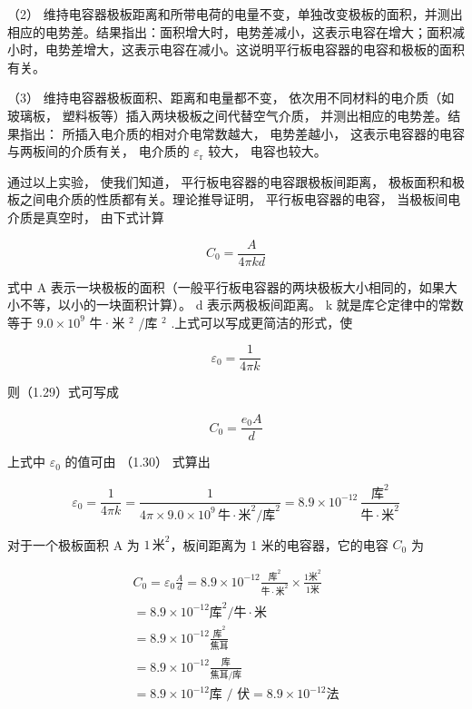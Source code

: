（2）
维持电容器极板距离和所带电荷的电量不变，单独改变极板的面积，并测出相应的电势差。结果指出：面积增大时，电势差减小，这表示电容在增大；面积减小时，电势差增大，这表示电容在减小。这说明平行板电容器的电容和极板的面积有关。

（3） 维持电容器极板面积、距离和电量都不变，
依次用不同材料的电介质（如玻璃板，
塑料板等）插入两块极板之间代替空气介质， 并测出相应的电势差。结果指出：
所插入电介质的相对介电常数越大， 电势差越小，
这表示电容器的电容与两板间的介质有关， 电介质的
\(\varepsilon_{\mathrm{r}}\) 较大， 电容也较大。

通过以上实验， 使我们知道， 平行板电容器的电容跟极板间距离，
极板面积和极板之间电介质的性质都有关。理论推导证明，
平行板电容器的电容， 当极板间电介质是真空时， 由下式计算

\[
C_{0} = \frac{A}{4 \pi k d} \tag{1.29}
\]

式中 A
表示一块极板的面积（一般平行板电容器的两块极板大小相同的，如果大小不等，以小的一块面积计算）。
d 表示两极板间距离。 k 就是库仑定律中的常数等于 \(9.0 \times 10^{9}\)
牛·米 \(^{2}\) /库 \(^{2}\) .上式可以写成更简洁的形式，使

\[
\varepsilon_{0}=\frac{1}{4\pi k} \tag{1.30}
\]

则（1.29）式可写成

\[
C_{0} = \frac{e_{0} A}{d} \tag{1.31}
\]

上式中 \(\varepsilon_{0}\) 的值可由 （1.30） 式算出

\[
\varepsilon_{0}=\frac{1}{4\pi k}=\frac{1}{4\pi\times9.0\times10^{9}\,\text{牛}\cdot\text{米}^{2}/\text{库}^{2}}=8.9\times10^{-12}\,\frac{\text{库}^{2}}{\text{牛}\cdot\text{米}^{2}}
\]

对于一个极板面积 A 为 \(1 \, \text{米}^{2}\)，板间距离为 1
米的电容器，它的电容 \(C_{0}\) 为

\[
\begin{array}{l} C_{0} = \varepsilon_{0} \frac{A}{d} = 8.9 \times 10^{- 12} \frac{\text{库}^{2}}{\text{牛} \cdot \text{米}^{2}} \times \frac{1 \text{米}^{2}}{1 \text{米}} \\ = 8.9 \times 10^{- 12} \text{库}^{2} / \text{牛} \cdot \text{米} \\ = 8.9 \times 10^{- 12} \frac{\text{库}^{2}}{\text{焦耳}} \\ = 8.9 \times 10^{- 12} \frac{\text{库}}{\text{焦耳} / \text{库}} \\ = 8.9 \times 10^{- 12} \text{库 / 伏} = 8.9 \times 10^{- 12} \text{法} \\ \end{array}
\]


